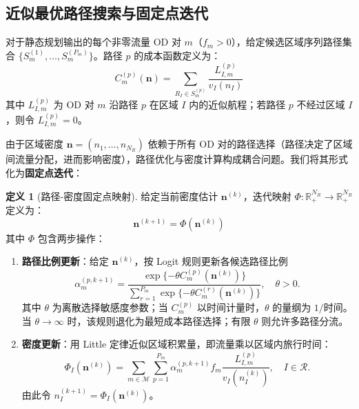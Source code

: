 \documentclass[a4paper,12pt]{article}
\theoremstyle{plain}
\theoremstyle{definition}
\newtheorem{definition}[theorem]{定义}
\theoremstyle{remark}
\begin{document}
\subsection{近似最优路径搜索与固定点迭代}

对于静态规划输出的每个非零流量 OD 对 $m$（$f_m > 0$），给定候选区域序列路径集合 $\{S_m^{(1)},\dots,S_m^{(P_m)}\}$。路径 $p$ 的成本函数定义为：
\begin{equation}\label{eq:path_cost}
    C_m^{(p)}(\bm n) = \sum_{R_I \in S_m^{(p)}} \frac{L_{I,m}^{(p)}}{v_I(n_I)}
\end{equation}
其中 $L_{I,m}^{(p)}$ 为 OD 对 $m$ 沿路径 $p$ 在区域 $I$ 内的近似航程；若路径 $p$ 不经过区域 $I$，则令 $L_{I,m}^{(p)}=0$。

由于区域密度 $\bm{n} = (n_1, \dots, n_{N_R})$ 依赖于所有 OD 对的路径选择（路径决定了区域间流量分配，进而影响密度），路径优化与密度计算构成耦合问题。我们将其形式化为\textbf{固定点迭代}：

\begin{definition}[路径-密度固定点映射]\label{def:fixed_point}
给定当前密度估计 $\bm{n}^{(k)}$，迭代映射 $\Phi: \mathbb{R}_{+}^{N_R} \to \mathbb{R}_{+}^{N_R}$ 定义为：
\begin{equation}\label{eq:fixed_point_map}
    \bm{n}^{(k+1)} = \Phi(\bm{n}^{(k)})
\end{equation}
其中 $\Phi$ 包含两步操作：
\begin{enumerate}
    \item \textbf{路径比例更新}：给定 $\bm{n}^{(k)}$，按 Logit 规则更新各候选路径比例
    \begin{equation}\label{eq:logit_update}
        \alpha_m^{(p,k+1)}
        =
        \frac{\exp\{-\theta C_m^{(p)}(\bm n^{(k)})\}}
        {\sum_{r=1}^{P_m}\exp\{-\theta C_m^{(r)}(\bm n^{(k)})\}},
        \quad \theta>0 .
    \end{equation}
    其中 $\theta$ 为离散选择敏感度参数；当 $C_m^{(p)}$ 以时间计量时，$\theta$ 的量纲为 $1/\text{时间}$。当 $\theta\to\infty$ 时，该规则退化为最短成本路径选择；有限 $\theta$ 则允许多路径分流。
    \item \textbf{密度更新}：用 Little 定律近似区域积累量，即流量乘以区域内旅行时间：
    \begin{equation}\label{eq:density_update}
        \Phi_I(\bm n^{(k)})
        =
        \sum_{m\in\mathcal M}\sum_{p=1}^{P_m}
        \alpha_m^{(p,k+1)} f_m
        \frac{L_{I,m}^{(p)}}{v_I(n_I^{(k)})},
        \quad I\in\mathcal R .
    \end{equation}
    由此令 $n_I^{(k+1)}=\Phi_I(\bm n^{(k)})$。
\end{enumerate}
\end{definition}
\end{document}
